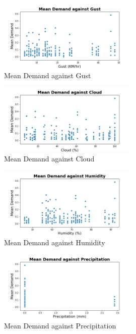 \documentclass[12pt, letterpaper] {article}
\begin{document}
\begin{figure}[H]
    \centering
    \includegraphics[width=0.6\textwidth, height=0.3\textheight]{Images/gust_mean_demand.jpg}
    \caption{Mean Demand against Gust}
    \label{fig:Mean Demand against Gust}
\end{figure}

\begin{figure}[H]
    \centering
    \includegraphics[width=0.6\textwidth, height=0.3\textheight]{Images/cloud_mean_demand.jpg}
    \caption{Mean Demand against Cloud}
    \label{fig:Mean Demand against Cloud}
\end{figure}

\begin{figure}[H]
    \centering
    \includegraphics[width=0.6\textwidth, height=0.3\textheight]{Images/humidity_mean_demand.jpg}
    \caption{Mean Demand against Humidity}
    \label{fig:Mean Demand against Humidity}
\end{figure}

\begin{figure}[H]
    \centering
    \includegraphics[width=0.6\textwidth, height=0.3\textheight]{Images/prec_mean_demand.jpg}
    \caption{Mean Demand against Precipitation}
    \label{fig:Mean Demand against Precipitation}
\end{figure}

 

\end{document}
